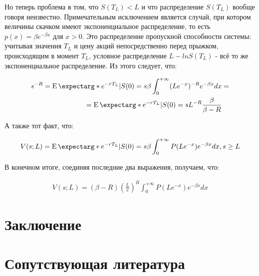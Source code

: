 \documentclass[a4paper,12pt]{article}
\theoremstyle{definition}
\newcommand{\expect}{\operatorname{E}\expectarg}
\begin{document}
Но теперь проблема в том, что $S(T_L) < L$ и что
распределение $S(T_L)$ вообще говоря неизвестно. Примечательным исключением является случай, при котором величины скачком имеют экспоненциальное распределение, то есть $p(x) = \beta e^{-\beta x}$ для $x > 0$. Это распределение пропускной способности системы: учитывая значения $T_L$ и цену акций
непосредственно перед прыжком, происходящим в момент $T_L$, условное распределение $L - ln S(T_L)$ - всё то же экспоненциальное распределение. Из этого следует, что:

\begin{equation*}
\begin{split}
    s^{-R} = \expect*{e^{-rT_L} | S(0) = s} \beta \int_{0}^{+\infty} (L e^{-x})^{-R} e^{-\beta x} dx &= \\
    = \expect*{e^{-rT_L} | S(0) = s} L^{-R} \frac{\beta}{\beta - R}
\end{split}
\end{equation*}

А также тот факт, что:

\begin{equation*}
\begin{split}
    V(s; L) = \expect*{e^{-rT_L} | S(0) = s} \beta \int_{0}^{+\infty} P(L e^{-x}) e^{-\beta x} dx, s \ge L
\end{split}
\end{equation*}

В конечном итоге, соединяя последние два выражения, получаем, что:

\begin{equation}\label{eq:strategy_price_m2}
\begin{split}
    V(s; L) = (\beta - R) (\frac{L}{s})^R \int_{0}^{+\infty} P(L e^{-x}) e^{-\beta x} dx
\end{split}
\end{equation}


\section{Заключение}

\section{Сопутствующая литература}
\end{document}
